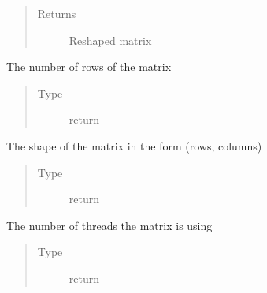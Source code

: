 \documentclass[letterpaper,10pt,english]{sphinxmanual}
\begin{document}
\begin{fulllineitems}
\begin{fulllineitems}
\begin{quote}
\begin{description}
\begin{itemize}
\end{itemize}

\item[{Returns}] \leavevmode
Reshaped matrix

\end{description}\end{quote}

\end{fulllineitems}


\begin{fulllineitems}
\label{\detokenize{libpymath.matrix:libpymath.matrix.matrix.Matrix.rows}}
The number of rows of the matrix
\begin{quote}\begin{description}
\item[{Type}] \leavevmode
return

\end{description}\end{quote}

\end{fulllineitems}


\begin{fulllineitems}
\label{\detokenize{libpymath.matrix:libpymath.matrix.matrix.Matrix.shape}}
The shape of the matrix in the form (rows, columns)
\begin{quote}\begin{description}
\item[{Type}] \leavevmode
return

\end{description}\end{quote}

\end{fulllineitems}


\begin{fulllineitems}
\label{\detokenize{libpymath.matrix:libpymath.matrix.matrix.Matrix.threads}}
The number of threads the matrix is using
\begin{quote}\begin{description}
\item[{Type}] \leavevmode
return


\end{description}
\end{quote}
\end{fulllineitems}
\end{fulllineitems}
\end{document}
